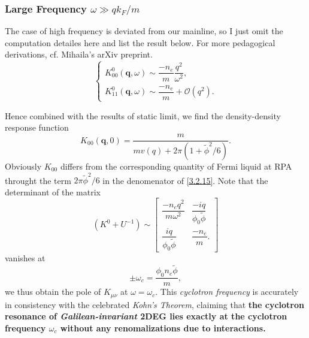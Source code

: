 \documentclass[bachelor,english,numbers]{ustcthesis}
\begin{document}
	\subsubsection{Large Frequency $\omega\gg qk_F/m$}
			The case of high frequency is deviated from our mainline, so I just omit the computation detailes here and list the result below. For more pedagogical derivations, cf. Mihaila's arXiv preprint\cite{mihaila2011lindhard}.
			\begin{equation}\label{3.2.14}
				\begin{cases}
					K^0_{00}(\bm{q},\omega)\sim\dfrac{-n_e}{m}\dfrac{q^2}{\omega^2},\\[1em]
					K^0_{11}(\bm{q},\omega)\sim\dfrac{-n_e}{m}+\mathcal{O}(q^2).
				\end{cases}
			\end{equation}

			\noindent Hence combined with the results of static limit, we find the density-density response function
			\begin{equation}\label{3.2.15}
				K_{00}(\bm{q},0)=\dfrac{m}{m v(q)+2\pi(1+\widetilde{\phi}^2/6)}.
			\end{equation}
			Obviously $K_{00}$ differs from the corresponding quantity of Fermi liquid at RPA throught the term $2\pi \widetilde{\phi}^2/6 $ in the denomenator of \eqref{3.2.15}. Note that the determinant of the matrix
			\begin{equation*}
				(K^0+U^{-1})\sim\left[
				\begin{array}{cc}
					\dfrac{-n_eq^2}{m\omega^2} & \dfrac{-iq}{\phi_0\widetilde{\phi}}\\
					\dfrac{iq}{\phi_0 \widetilde{\phi} } & \dfrac{-n_e}{m}.
				\end{array}\right]
			\end{equation*}
			vanishes at
			\begin{equation}
				\pm\omega_c=\dfrac{\phi_0 n_e \widetilde{\phi} }{m},
			\end{equation}
			we thus obtain the pole of $K_{\mu\nu}$ at $\omega=\omega_c$. This \emph{cyclotron frequency} is accurately in consistency with the celebrated \emph{Kohn's Theorem}\cite{kohn1961cyclotron}, claiming that\cite{Fradkin2013Field} {\bf the cyclotron resonance of \emph{Galilean-invariant} 2DEG lies exactly at the cyclotron frequency $\omega_c$ without any renomalizations due to interactions.}


\end{document}
